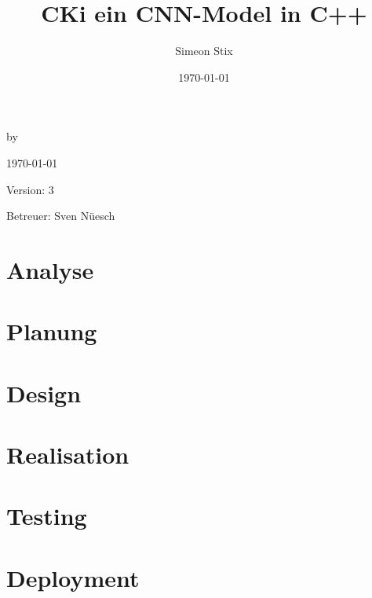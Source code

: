 \documentclass[a4paper,oneside,12pt]{report}
\title{CKi ein CNN-Model in C++}
\author{Simeon Stix}
\date{\today}
\renewcommand{\maketitle}{
\begin{titlepage}
    \begin{center}
        \vspace*{1cm}
        
        \Huge
        \textbf{\thetitle}
        
        \vspace{0.5cm}
        \Large
        by \theauthor
        
        \vspace{1.5cm}
        
        \today
        
        \vfill
        
        Version: 3
        
        \vspace{1cm}
        
        Betreuer: Sven Nüesch
        
    \end{center}
\end{titlepage}
}
\begin{document}
\maketitle

\pagestyle{plain} %

\tableofcontents %
\setcounter{secnumdepth}{4} %
\setcounter{tocdepth}{3} %

\chapter{Analyse}
\label{sec:Analyse}


\chapter{Planung}
\label{sec:Planung}


\chapter{Design}
\label{sec:Design}


\chapter{Realisation}
\label{sec:Realisation}


\chapter{Testing}
\label{sec:Testing}


\chapter{Deployment}
\label{sec:Deployment}



\clearpage
{}
\nocite{*} %
\end{document}
